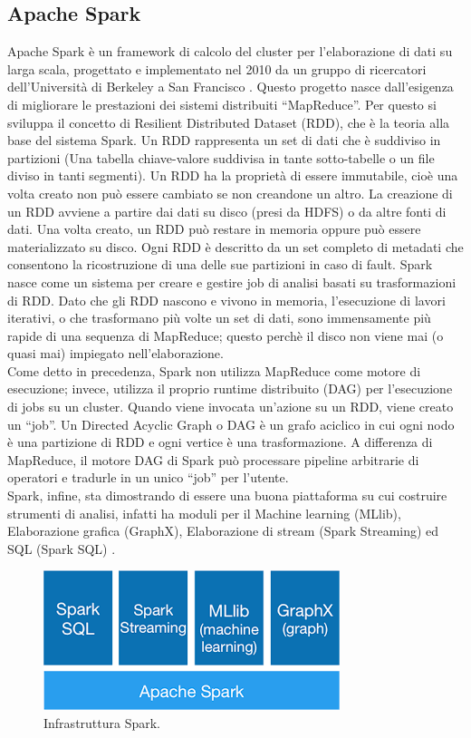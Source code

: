 \subsection{Apache Spark}
\label{sec:spark}
Apache Spark è un framework di calcolo del cluster per l'elaborazione di dati su larga scala, progettato e implementato nel 2010 da un gruppo di ricercatori dell’Università di Berkeley a San Francisco \cite{spark:hadoop}. Questo progetto nasce dall'esigenza di migliorare le prestazioni dei sistemi distribuiti “MapReduce”. Per questo si sviluppa il concetto di Resilient Distributed Dataset (RDD), che è la teoria alla base del sistema Spark. Un RDD rappresenta un set di dati che è suddiviso in partizioni (Una tabella chiave-valore suddivisa in tante sotto-tabelle o un file diviso in tanti segmenti). Un RDD ha la proprietà di essere immutabile, cioè una volta creato non può essere cambiato se non creandone un altro. La creazione di un RDD avviene a partire dai dati su disco (presi da HDFS) o da altre fonti di dati. Una volta creato, un RDD può restare in memoria oppure può essere materializzato su disco. Ogni RDD è descritto da un set completo di metadati che consentono la ricostruzione di una delle sue partizioni in caso di fault. Spark nasce come un sistema per creare e gestire job di analisi basati su trasformazioni di RDD. Dato che gli RDD nascono e vivono in memoria, l’esecuzione di lavori iterativi, o che trasformano più volte un set di dati, sono immensamente più rapide di una sequenza di MapReduce; questo perchè il disco non viene mai (o quasi mai) impiegato nell’elaborazione.
\\Come detto in precedenza, Spark non utilizza MapReduce come motore di esecuzione; invece, utilizza il proprio runtime distribuito (DAG) per l’esecuzione di jobs su un cluster. Quando viene invocata un’azione su un RDD, viene creato un “job”. Un Directed Acyclic Graph o DAG è un grafo aciclico in cui ogni nodo è una partizione di RDD e ogni vertice è una trasformazione. A differenza di MapReduce, il motore DAG di Spark può processare pipeline arbitrarie di operatori e tradurle in un unico “job” per l'utente.
\\Spark, infine, sta dimostrando di essere una buona piattaforma su cui costruire strumenti di analisi, infatti ha moduli per il Machine learning (MLlib), Elaborazione grafica (GraphX), Elaborazione di stream (Spark Streaming) ed SQL (Spark SQL) \cite{spark:hadoop}.
\begin{figure}[H]
	\centering
	\includegraphics[width=\textwidth]{images/spark.png}
	\caption{Infrastruttura Spark.}
	\label{fig:sparkOverview}
\end{figure}
